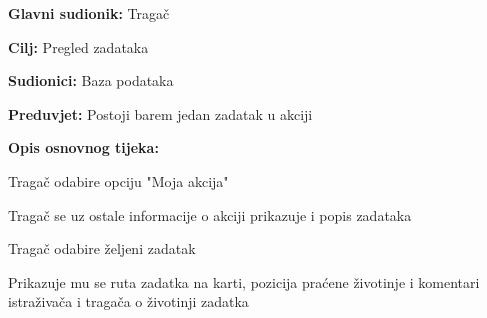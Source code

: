 					\begin{packed_item}
	
						\item \textbf{Glavni sudionik: } Tragač
						\item  \textbf{Cilj:} Pregled zadataka 
						\item  \textbf{Sudionici:} Baza podataka
						\item  \textbf{Preduvjet:} Postoji barem jedan zadatak u akciji
						\item  \textbf{Opis osnovnog tijeka:}
						
						\item[] \begin{packed_enum}
							\item Tragač odabire opciju "Moja akcija"
							\item Tragač se uz ostale informacije o akciji prikazuje i popis zadataka
							\item Tragač odabire željeni zadatak
							\item Prikazuje mu se ruta zadatka na karti, pozicija praćene životinje i komentari istraživača i tragača o životinji zadatka

						\end{packed_enum}
					\end{packed_item}
					\noindent {}
